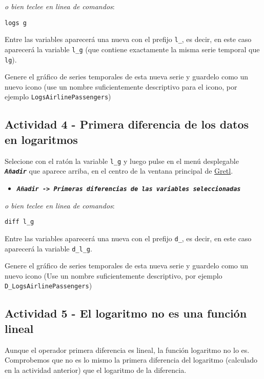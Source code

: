 \documentclass[11pt]{article}
\begin{document}
{\vspace{0pt} \footnotesize \color{gray!70!black}
\emph{o bien teclee en linea de comandos}: 
\begin{verbatim}
logs g
\end{verbatim}
}

Entre las variables aparecerá una nueva con el prefijo \texttt{l\_}, es decir,
en este caso aparecerá la variable \texttt{l\_g} (que contiene exactamente la
misma serie temporal que \texttt{lg}).

Genere el gráfico de series temporales de esta nueva serie y guardelo
como un nuevo icono (use un nombre suficientemente descriptivo para el
icono, por ejemplo \texttt{LogsAirlinePassengers})

\subsection{Actividad 4 - Primera diferencia de los datos en logaritmos}
\label{sec:orgb4584b3}

Selecione con el ratón la variable \texttt{l\_g} y luego pulse en el menú desplegable \textbf{\emph{\texttt{Añadir}}} que aparece arriba, en el centro de la
ventana principal de \href{https://gretl.sourceforge.net/es.html}{Gretl}.
\begin{itemize}
\item \textbf{\emph{\texttt{Añadir -> Primeras diferencias de las variables seleccionadas}}}
\end{itemize}

{\vspace{0pt} \footnotesize \color{gray!70!black}
\emph{o bien teclee en linea de comandos}: 
\begin{verbatim}
diff l_g
\end{verbatim}
}

Entre las variables aparecerá una nueva con el prefijo \texttt{d\_}, es decir,
en este caso aparecerá la variable \texttt{d\_l\_g}.

Genere el gráfico de series temporales de esta nueva serie y guardelo
como un nuevo icono (Use un nombre suficientemente descriptivo, por
ejemplo \texttt{D\_LogsAirlinePassengers})

\subsection{Actividad 5 - El logaritmo no es una función lineal}
\label{sec:orgf2382ca}

Aunque el operador primera diferencia es lineal, la función logaritmo
no lo es. Comprobemos que no es lo mismo la primera diferencia del
logaritmo (calculado en la actividad anterior) que el logaritmo de la
diferencia.
\end{document}
